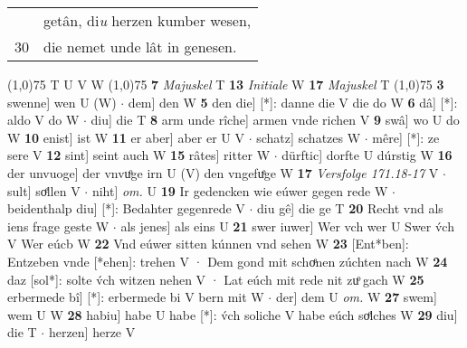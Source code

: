 \documentclass[8pt,a4paper,notitlepage]{article}
\begin{document}
\begin{table}[ht]
\begin{minipage}[t]{0.5\linewidth}
\begin{tabular}{rl}
 & getân, di\textit{u} herzen kumber wesen,\\ 
30 & die nemet unde lât in genesen.\\ 
\end{tabular}
\scriptsize
\line(1,0){75} \newline
T U V W \newline
\line(1,0){75} \newline
\textbf{7} \textit{Majuskel} T  \textbf{13} \textit{Initiale} W  \textbf{17} \textit{Majuskel} T  \newline
\line(1,0){75} \newline
\textbf{3} swenne] wen U (W)  $\cdot$ dem] den W \textbf{5} den die] [*]: danne die V die do W \textbf{6} dâ] [*]: aldo V do W  $\cdot$ diu] die T \textbf{8} arm unde rîche] armen vnde richen V \textbf{9} swâ] wo U do W \textbf{10} enist] ist W \textbf{11} er aber] aber er U V  $\cdot$ schatz] schatzes W  $\cdot$ mêre] [*]: ze sere V \textbf{12} sint] seint auch W \textbf{15} râtes] ritter W  $\cdot$ dürftic] dorfte U dúrstig W \textbf{16} der unvuoge] der vnvuͦge irn U (V) den vngefuͤge W \textbf{17} \textit{Versfolge 171.18-17} V   $\cdot$ sult] soͤllen V  $\cdot$ niht] \textit{om.} U \textbf{19} Ir gedencken wie eúwer gegen rede W  $\cdot$ beidenthalp diu] [*]: Bedahter gegenrede V  $\cdot$ diu gê] die ge T \textbf{20} Recht vnd als iens frage geste W  $\cdot$ als jenes] als eins U \textbf{21} swer iuwer] Wer vch wer U Swer v́ch V Wer eúcb W \textbf{22} Vnd eúwer sitten kúnnen vnd sehen W \textbf{23} [Ent*ben]: Entzeben vnde [*ehen]: trehen V · Dem gond mit schoͤnen zúchten nach W \textbf{24} daz [sol*]: solte v́ch witzen nehen V · Lat eúch mit rede nit zuͦ gach W \textbf{25} erbermede bî] [*]: erbermede bi V bern mit W  $\cdot$ der] dem U \textit{om.} W \textbf{27} swem] wem U W \textbf{28} habiu] habe U habe [*]: v́ch soliche V habe eúch soͤlches W \textbf{29} diu] die T  $\cdot$ herzen] herze V \newline
\end{minipage}
\end{table}
\end{document}
